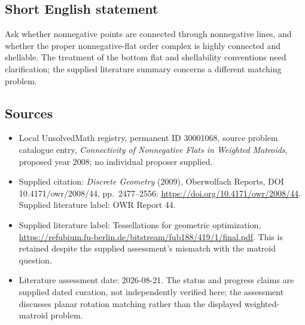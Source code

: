 \documentclass[11pt]{article}
\begin{document}
\subsection{Short English statement}
Ask whether nonnegative points are connected through nonnegative lines, and whether the proper nonnegative-flat order complex is highly connected and shellable. The treatment of the bottom flat and shellability conventions need clarification; the supplied literature summary concerns a different matching problem.
\subsection{Sources}
\begin{itemize}\item Local UnsolvedMath registry, permanent ID 30001068, source problem catalogue entry, \emph{Connectivity of Nonnegative Flats in Weighted Matroids}, proposed year 2008; no individual proposer supplied.\item Supplied citation: \emph{Discrete Geometry} (2009), Oberwolfach Reports, DOI 10.4171/owr/2008/44, pp.\ 2477--2556: \url{https://doi.org/10.4171/owr/2008/44}. Supplied literature label: OWR Report 44.\item Supplied literature label: Tessellations for geometric optimization, \url{https://refubium.fu-berlin.de/bitstream/fub188/419/1/final.pdf}. This is retained despite the supplied assessment's mismatch with the matroid question.\item Literature assessment date: 2026-08-21. The status and progress claims are supplied dated curation, not independently verified here; the assessment discusses planar rotation matching rather than the displayed weighted-matroid problem.\end{itemize}
\end{document}
